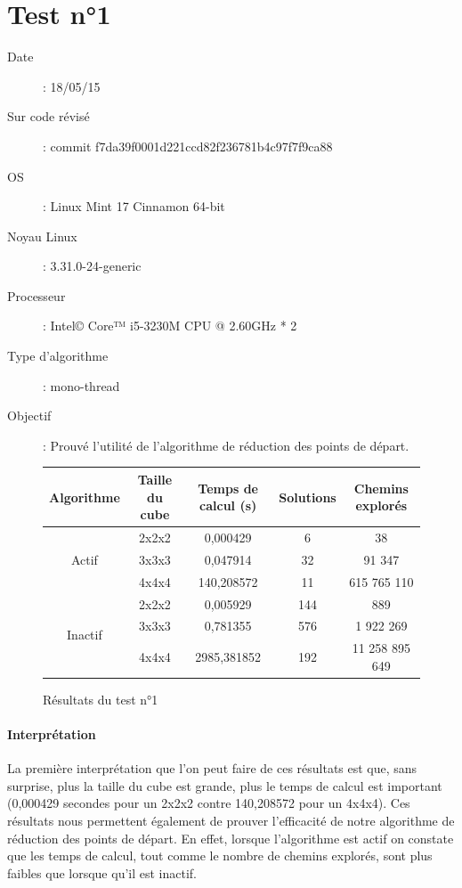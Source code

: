 \section{Test n°1}

\begin{description}
 \item[Date]: 18/05/15
 \item[Sur code révisé]: commit f7da39f0001d221ccd82f236781b4c97f7f9ca88
 \item[OS]: Linux Mint 17 Cinnamon 64-bit
 \item[Noyau Linux]: 3.31.0-24-generic
 \item[Processeur]: Intel© Core™ i5-3230M CPU @ 2.60GHz * 2
 \item[Type d'algorithme]: mono-thread
 \item[Objectif]: Prouvé l'utilité de l'algorithme de réduction des points de départ.
\end{description}

\begin{figure}[h]
\begin{tabular}{|*{5}{c|}}
\hline
Algorithme&Taille du cube&Temps de calcul (s)&Solutions&Chemins explorés \\
\hline
\multirow{3}{*}{Actif}&2x2x2&0,000429&6&38 \\
&3x3x3&0,047914&32&91 347 \\
&4x4x4&140,208572&11&615 765 110 \\
\hline
\multirow{3}{*}{Inactif}&2x2x2&0,005929&144&889 \\
&3x3x3&0,781355&576&1 922 269 \\
&4x4x4&2985,381852&192&11 258 895 649 \\
\hline
\end{tabular}
\caption{Résultats du test n°1}
\end{figure}

\newpage

\paragraph{Interprétation} La première interprétation que l'on peut faire de ces résultats est que, sans surprise, plus la taille du cube est grande, plus le temps de calcul est important (0,000429 secondes pour un 2x2x2 contre 140,208572 pour un 4x4x4). Ces résultats nous permettent également de prouver l'efficacité de notre algorithme de réduction des points de départ. En effet, lorsque l'algorithme est actif on constate que les temps de calcul, tout comme le nombre de chemins explorés, sont plus faibles que lorsque qu'il est inactif.

